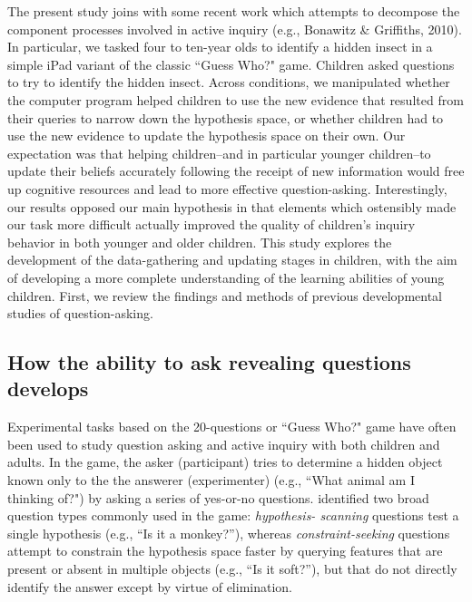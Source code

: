 \documentclass[man,floatsintext]{apa6}
\begin{document}
\nocite{Bonawitz:2010pb}
The present study joins with some recent work which attempts to decompose the 
component processes involved in active inquiry (e.g., Bonawitz \& Griffiths, 2010).  
In particular, we tasked four to ten-year olds to identify a hidden insect in
a simple iPad variant of the classic ``Guess Who?" game. Children asked questions to try 
to identify the hidden insect. Across conditions, we manipulated whether the computer program 
helped children to use the new evidence that resulted from their queries to narrow down the
hypothesis space, or whether children had to use the new evidence to update the hypothesis space
on their own.  Our expectation was that helping children--and in particular younger children--to update their beliefs accurately following the 
receipt of new information would free up cognitive resources and lead to more effective question-asking. 
Interestingly, our results opposed our main hypothesis in that elements which 
ostensibly made our task more difficult actually improved the quality of children's inquiry behavior in both younger and older children.  
This study explores the development of the data-gathering and updating stages in children, with 
the aim of developing a more complete understanding of the learning abilities of young children. First, we review the findings and methods of previous developmental studies of question-asking.

\subsection{How the ability to ask revealing questions develops}

Experimental tasks based on the 20-questions or ``Guess Who?" game have often been used to
study question asking and active inquiry with both children and adults.
In the game, the asker (participant) tries to determine a hidden object known
only to the the answerer (experimenter) (e.g., ``What animal am I thinking of?")
by asking a series of yes-or-no questions.
 identified two broad question types commonly used in the game: \emph{hypothesis-
scanning} questions test a single hypothesis (e.g., ``Is it a monkey?''), whereas 
\emph{constraint-seeking} questions attempt to constrain the hypothesis space faster by 
querying features that are present or absent in multiple objects (e.g., ``Is it soft?''), 
but that do not directly identify the answer except by virtue of elimination. 
\end{document}
